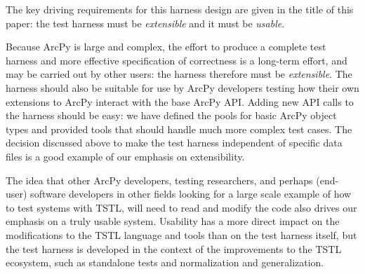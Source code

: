 The key driving requirements for this harness design are given in the
title of this paper:  the test harness must be \emph{extensible} and
it must be \emph{usable}.

Because ArcPy is large and complex, the effort to produce a
complete test harness and more effective specification of correctness
is a long-term effort, and may be carried out by other users:  the
harness therefore must be \emph{extensible}.  The
harness should also be suitable for use by ArcPy developers testing
how their own extensions to ArcPy interact with the base ArcPy API.
Adding new API calls to the harness should be easy:  we have defined
the pools for basic ArcPy object types and provided tools that should
handle much more complex test cases.  The decision discussed above to
make the test harness independent of specific data files is a good
example of our emphasis on extensibility.

The idea that other ArcPy developers, testing researchers, and perhaps
(end-user) software developers in other fields looking for a large
scale example of how to test systems with TSTL, will need to read and
modify the code also drives our emphasis on a truly usable system.
Usability has a more direct impact on the modifications to the TSTL
language and tools than on the test harness itself, but the test
harness is developed in the context of the improvements to the TSTL
ecosystem, such as standalone tests and normalization and
generalization.

